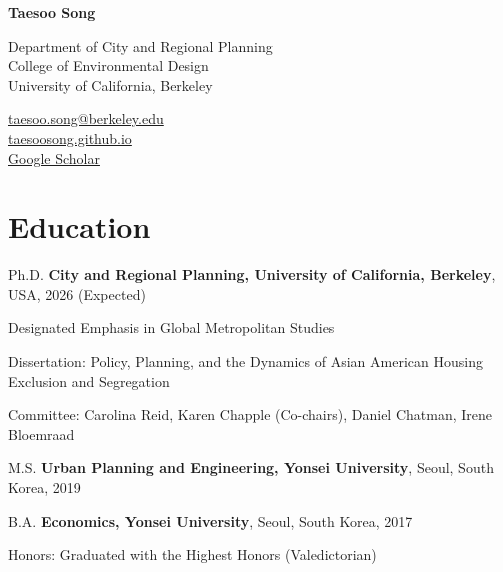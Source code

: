 \documentclass[12pt,letterpaper]{report}
\newcommand{\myname}{Taesoo Song}
\newcommand{\namefont}[1]{{\normalfont\bfseries\Huge{#1}}}
\newcommand{\listitemspace}{0.4em}
\renewenvironment{itemize}
{\begin{list}{}{\setlength{\leftmargin}{0.5em}
                \setlength{\parskip}{0em}
                \setlength{\itemsep}{\listitemspace}
                \setlength{\parsep}{\listitemspace}}}
{\end{list}}
\begin{document}
    \raggedright{}

    \namefont{\myname}

    \vspace{1em}
    \begin{minipage}[t]{0.695\textwidth}
        Department of City and Regional Planning\\
        College of Environmental Design\\
        University of California, Berkeley
    \end{minipage}
    \begin{minipage}[t]{0.300\textwidth}
        \flushright{}
        \href{mailto:taesoo.song@berkeley.edu}{taesoo.song@berkeley.edu} \\
        \href{https://taesoosong.github.io}{taesoosong.github.io}\\
        \href{https://scholar.google.com/citations?user=xM5Rc-EAAAAJ&hl=en}{Google Scholar}\\
    \end{minipage}

    \section*{Education}
    
    \begin{tablist}
      \item[Ph.D.] \tab{}\textbf{City and Regional Planning, University of California, Berkeley}, USA, 2026 (Expected)
        \item \tab{}Designated Emphasis in Global Metropolitan Studies
      \begin{itemize}
        \item Dissertation: Policy, Planning, and the Dynamics of Asian American Housing Exclusion and Segregation
        \vspace{-0.6em}
        \item Committee: Carolina Reid, Karen Chapple (Co-chairs), Daniel Chatman, Irene Bloemraad
      \end{itemize}
      \item[M.S.] \tab{}\textbf{Urban Planning and Engineering, Yonsei University}, Seoul, South Korea, 2019
      \item[B.A.] \tab{}\textbf{Economics, Yonsei University}, Seoul, South Korea, 2017
      \begin{itemize}
        \item Honors: Graduated with the Highest Honors (Valedictorian)
      \end{itemize}
    \end{tablist}
\end{document}
